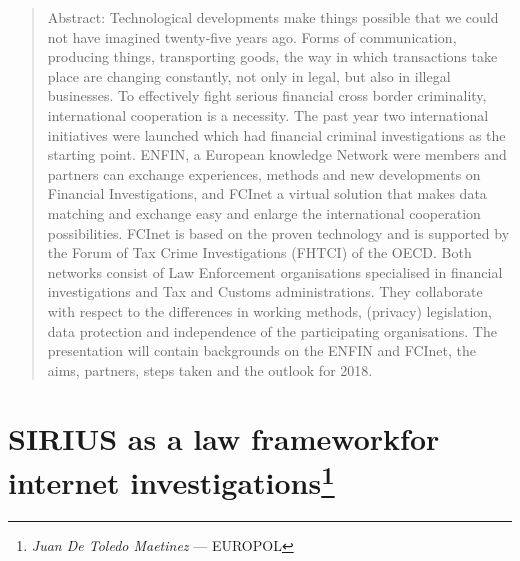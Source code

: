 \documentclass[]{book}
\let\rmarkdownfootnote\footnote%
\def\footnote{\protect\rmarkdownfootnote}
\theoremstyle{definition}
\theoremstyle{definition}
\theoremstyle{definition}
\theoremstyle{remark}
\begin{document}
\begin{quote}
Abstract: Technological developments make things possible that we could
not have imagined twenty-five years ago. Forms of communication,
producing things, transporting goods, the way in which transactions take
place are changing constantly, not only in legal, but also in illegal
businesses. To effectively fight serious financial cross border
criminality, international cooperation is a necessity. The past year two
international initiatives were launched which had financial criminal
investigations as the starting point. ENFIN, a European knowledge
Network were members and partners can exchange experiences, methods and
new developments on Financial Investigations, and FCInet a virtual
solution that makes data matching and exchange easy and enlarge the
international cooperation possibilities. FCInet is based on the proven
technology and is supported by the Forum of Tax Crime Investigations
(FHTCI) of the OECD. Both networks consist of Law Enforcement
organisations specialised in financial investigations and Tax and
Customs administrations. They collaborate with respect to the
differences in working methods, (privacy) legislation, data protection
and independence of the participating organisations. The presentation
will contain backgrounds on the ENFIN and FCInet, the aims, partners,
steps taken and the outlook for 2018.
\end{quote}

\section[SIRIUS as a law frameworkfor internet
investigations]{\texorpdfstring{SIRIUS as a law frameworkfor internet
investigations\footnote{\emph{Juan De Toledo Maetinez} --- EUROPOL}}{SIRIUS as a law frameworkfor internet investigations}}\label{sirius-as-a-law-frameworkfor-internet-investigations}
\end{document}
